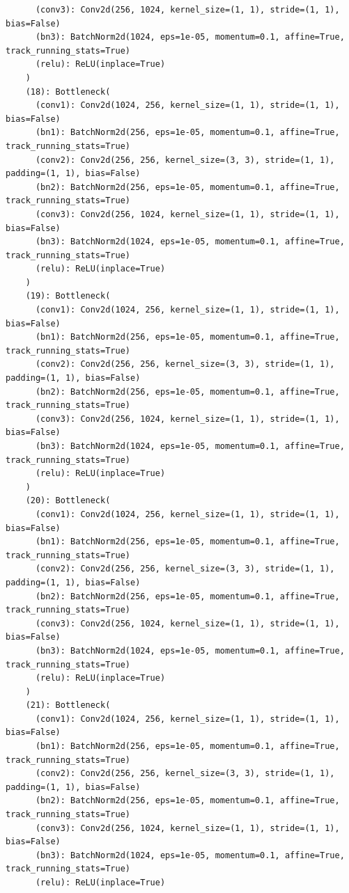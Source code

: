 \documentclass{article}
\begin{document}
\begin{verbatim}
      (conv3): Conv2d(256, 1024, kernel_size=(1, 1), stride=(1, 1), bias=False)
      (bn3): BatchNorm2d(1024, eps=1e-05, momentum=0.1, affine=True, track_running_stats=True)
      (relu): ReLU(inplace=True)
    )
    (18): Bottleneck(
      (conv1): Conv2d(1024, 256, kernel_size=(1, 1), stride=(1, 1), bias=False)
      (bn1): BatchNorm2d(256, eps=1e-05, momentum=0.1, affine=True, track_running_stats=True)
      (conv2): Conv2d(256, 256, kernel_size=(3, 3), stride=(1, 1), padding=(1, 1), bias=False)
      (bn2): BatchNorm2d(256, eps=1e-05, momentum=0.1, affine=True, track_running_stats=True)
      (conv3): Conv2d(256, 1024, kernel_size=(1, 1), stride=(1, 1), bias=False)
      (bn3): BatchNorm2d(1024, eps=1e-05, momentum=0.1, affine=True, track_running_stats=True)
      (relu): ReLU(inplace=True)
    )
    (19): Bottleneck(
      (conv1): Conv2d(1024, 256, kernel_size=(1, 1), stride=(1, 1), bias=False)
      (bn1): BatchNorm2d(256, eps=1e-05, momentum=0.1, affine=True, track_running_stats=True)
      (conv2): Conv2d(256, 256, kernel_size=(3, 3), stride=(1, 1), padding=(1, 1), bias=False)
      (bn2): BatchNorm2d(256, eps=1e-05, momentum=0.1, affine=True, track_running_stats=True)
      (conv3): Conv2d(256, 1024, kernel_size=(1, 1), stride=(1, 1), bias=False)
      (bn3): BatchNorm2d(1024, eps=1e-05, momentum=0.1, affine=True, track_running_stats=True)
      (relu): ReLU(inplace=True)
    )
    (20): Bottleneck(
      (conv1): Conv2d(1024, 256, kernel_size=(1, 1), stride=(1, 1), bias=False)
      (bn1): BatchNorm2d(256, eps=1e-05, momentum=0.1, affine=True, track_running_stats=True)
      (conv2): Conv2d(256, 256, kernel_size=(3, 3), stride=(1, 1), padding=(1, 1), bias=False)
      (bn2): BatchNorm2d(256, eps=1e-05, momentum=0.1, affine=True, track_running_stats=True)
      (conv3): Conv2d(256, 1024, kernel_size=(1, 1), stride=(1, 1), bias=False)
      (bn3): BatchNorm2d(1024, eps=1e-05, momentum=0.1, affine=True, track_running_stats=True)
      (relu): ReLU(inplace=True)
    )
    (21): Bottleneck(
      (conv1): Conv2d(1024, 256, kernel_size=(1, 1), stride=(1, 1), bias=False)
      (bn1): BatchNorm2d(256, eps=1e-05, momentum=0.1, affine=True, track_running_stats=True)
      (conv2): Conv2d(256, 256, kernel_size=(3, 3), stride=(1, 1), padding=(1, 1), bias=False)
      (bn2): BatchNorm2d(256, eps=1e-05, momentum=0.1, affine=True, track_running_stats=True)
      (conv3): Conv2d(256, 1024, kernel_size=(1, 1), stride=(1, 1), bias=False)
      (bn3): BatchNorm2d(1024, eps=1e-05, momentum=0.1, affine=True, track_running_stats=True)
      (relu): ReLU(inplace=True)

\end{verbatim}
\end{document}
